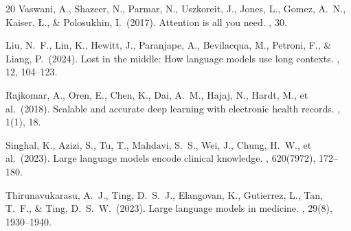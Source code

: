 \documentclass[11pt,a4paper]{article}
\begin{document}
\begin{thebibliography}{20}
Vaswani, A., Shazeer, N., Parmar, N., Uszkoreit, J., Jones, L., Gomez, A.\ N.,
Kaiser, \L., \& Polosukhin, I.\ (2017).
\newblock Attention is all you need.
, 30.

Liu, N.\ F., Lin, K., Hewitt, J., Paranjape, A., Bevilacqua, M., Petroni, F.,
\& Liang, P.\ (2024).
\newblock Lost in the middle: How language models use long contexts.
, 12, 104--123.

Rajkomar, A., Oren, E., Chen, K., Dai, A.\ M., Hajaj, N., Hardt, M., et al.\ (2018).
\newblock Scalable and accurate deep learning with electronic health records.
, 1(1), 18.

Singhal, K., Azizi, S., Tu, T., Mahdavi, S.\ S., Wei, J., Chung, H.\ W., et al.\ (2023).
\newblock Large language models encode clinical knowledge.
, 620(7972), 172--180.

Thirunavukarasu, A.\ J., Ting, D.\ S.\ J., Elangovan, K., Gutierrez, L., Tan, T.\ F., \& Ting, D.\ S.\ W.\ (2023).
\newblock Large language models in medicine.
, 29(8), 1930--1940.

\end{thebibliography}
\end{document}

